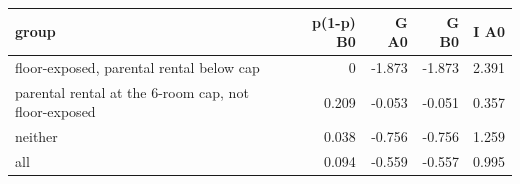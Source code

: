 \begin{tabular}{lrrrr}
\toprule
group & p(1-p) B0 & G A0 & G B0 & I A0 \\
\midrule
floor-exposed, parental rental below cap & 0 & -1.873 & -1.873 & 2.391 \\
parental rental at the 6-room cap, not floor-exposed & 0.209 & -0.053 & -0.051 & 0.357 \\
neither & 0.038 & -0.756 & -0.756 & 1.259 \\
all & 0.094 & -0.559 & -0.557 & 0.995 \\
\bottomrule
\end{tabular}
